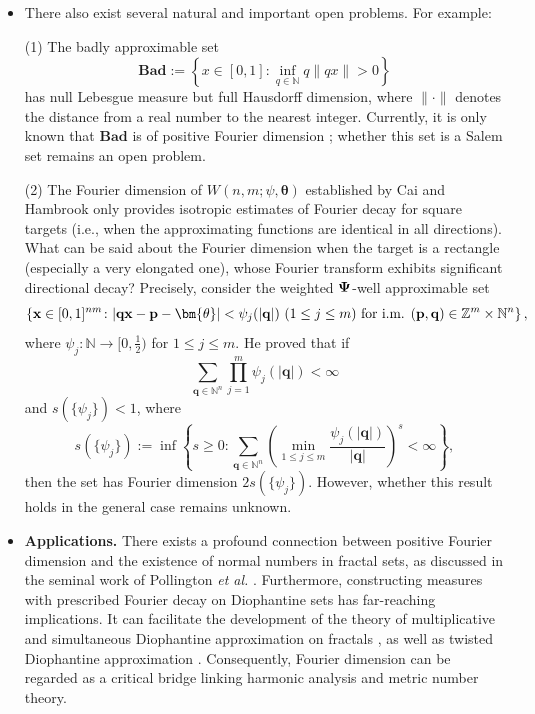 \documentclass[12pt,a4paper,twoside]{article}
\begin{document}
\begin{itemize}
\item There also exist several natural and important open problems. For example$\colon$

(1) The badly approximable set
\[
\textbf{Bad} := \left\{ x \in [0,1] : \inf_{q \in \mathbb{N}} q \|qx\| > 0 \right\}
\]
has null Lebesgue measure but full Hausdorff dimension, where  \(\|\cdot\|\) denotes the distance from a real number to the nearest integer. Currently, it is only known that \(\textbf{Bad}\) is of positive Fourier dimension \cite{K80,QR03}; whether this set is a Salem set remains an open problem.

(2) The Fourier dimension of \(W(n,m;\psi,\bm{\theta})\) established by Cai and Hambrook only provides isotropic estimates of Fourier decay for square targets (i.e., when the approximating functions are identical in all directions). What can be said about the Fourier dimension when the target is a rectangle (especially a very elongated one), whose Fourier transform exhibits significant directional decay? Precisely, consider  the weighted \({\bf \Psi}\)-well approximable set
\[\left\{{\bf x}\in [0,1]^{nm}\colon |{\bf qx}-{\bf p}-\bm{\theta}|<\psi_j(|{\bf q}|)~ (1\le j\le m) \text{ for i.m. } ({\bf p},{\bf q})\in \mathbb{Z}^{m}\times \mathbb{N}^{n}\right\},\]
where  $\psi_j\colon\mathbb{N}\to [0,\frac{1}{2})$ for $1\le j\le m.$ He \cite{H26} proved that if
\[\sum_{\mathbf{q} \in \mathbb{N}^n} \prod_{j=1}^m \psi_j(|\mathbf{q}|) < \infty\]
   and  \(s(\{\psi_j\}) < 1\), where
\[
  s(\{\psi_j\}) := \inf \left\{ s \geq 0 : \sum_{\mathbf{q} \in \mathbb{N}^n } \left( \min_{1 \leq j \leq m} \frac{\psi_j(|\mathbf{q}|)}{|\mathbf{q}|} \right)^s < \infty \right\},
\]
then the set has Fourier dimension \(2s(\{\psi_j\})\). However, whether this result  holds in the general case remains unknown.



\item[] {\textbf{Applications.}} There exists a profound connection between positive Fourier dimension and the existence of normal numbers in fractal sets, as discussed in the seminal work of Pollington \emph{et al.} \cite{PVZZ22}. Furthermore, constructing measures with prescribed Fourier decay on Diophantine sets has far-reaching implications. It can facilitate the development of the theory of multiplicative and simultaneous Diophantine approximation on fractals \cite{PV00,CY24,TZ26+}, as well as twisted Diophantine approximation \cite{HR25,CZ25}. Consequently, Fourier dimension can be regarded as a critical bridge linking harmonic analysis and metric number theory.

\end{itemize}
\end{document}
